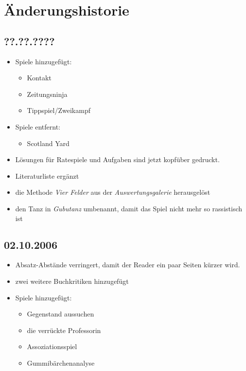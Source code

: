 \chapter{Änderungshistorie}
\section*{??.??.????}
\begin{itemize}
  \item Spiele hinzugefügt:
    \begin{itemize}
      \item Kontakt
      \item Zeitungsninja
      \item Tippspiel/Zweikampf
    \end{itemize}
  \item Spiele entfernt:
    \begin{itemize}
      \item Scotland Yard
    \end{itemize}
  \item Lösungen für Ratespiele und Aufgaben sind jetzt kopfüber gedruckt.
  \item Literaturliste ergänzt
  \item die Methode \emph{Vier Felder} aus der \emph{Auswertungsgalerie} herausgelöst
  \item den Tanz in \emph{Gubutanz} umbenannt, damit das Spiel nicht mehr so rassistisch ist
\end{itemize}


\section*{02.10.2006}
\begin{itemize}
  \item Absatz-Abstände verringert, damit der Reader ein paar Seiten kürzer wird.
  \item zwei weitere Buchkritiken hinzugefügt
  \item Spiele hinzugefügt:
  \begin{itemize}
    \item Gegenstand aussuchen
    \item die verrückte Professorin
    \item Assoziationsspiel
    \item Gummibärchenanalyse
  \end{itemize}
\end{itemize}



